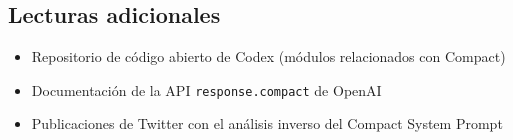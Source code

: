 \documentclass[a4paper]{article}
\begin{document}
\subsection{Lecturas adicionales}

\begin{itemize}
    \item Repositorio de código abierto de Codex (módulos relacionados con Compact)
    \item Documentación de la API \texttt{response.compact} de OpenAI
    \item Publicaciones de Twitter con el análisis inverso del Compact System Prompt
\end{itemize}

\end{document}
